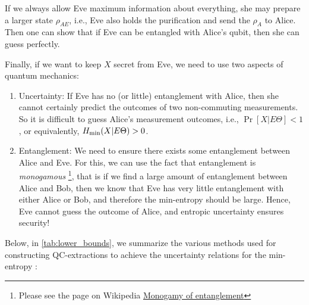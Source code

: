 If we always allow Eve maximum information about everything, she may prepare a larger state $\rho_{AE}$,  i.e., Eve also holds the purification and send the $\rho_A$ to Alice.  Then one can show that if Eve can be entangled with Alice’s qubit, then she can guess perfectly.

Finally, if we want to keep $X$ secret from Eve, we need to use two aspects of quantum mechanics:
\begin{enumerate}
    \item Uncertainty: If Eve has no (or little) entanglement with Alice, then she cannot certainly predict the outcomes of two non-commuting measurements. So it is difficult to guess Alice’s measurement outcomes, i.e., $\Pr[X | E \Theta] < 1$, or equivalently, $H_{{\min}}(X | E \Theta) > 0$.
    \item Entanglement: We need to ensure there exists some entanglement between Alice and Eve. For this, we can use the fact that entanglement is \textit{monogamous} \footnote{Please see the page on Wikipedia \href{https://en.wikipedia.org/wiki/Monogamy_of_entanglement}{Monogamy of entanglement}}, that is if we find a large amount of entanglement between Alice and Bob, then we know that Eve has very little entanglement with either Alice or Bob, and therefore the min-entropy should be large. Hence, Eve cannot guess the outcome of Alice, and entropic uncertainty ensures security!
\end{enumerate}



Below, in \autoref{tab:lower_bounds}, we summarize the various methods used for constructing QC-extractions to achieve the uncertainty relations for the min-entropy \cite{berta2013quantum,Berta_2014}:

